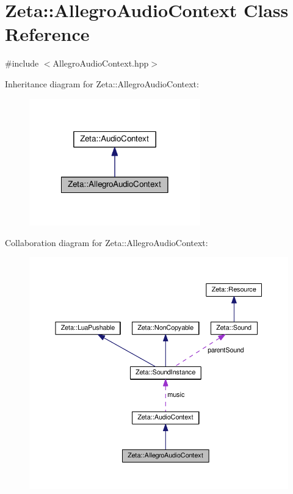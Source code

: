 \hypertarget{classZeta_1_1AllegroAudioContext}{\section{Zeta\+:\+:Allegro\+Audio\+Context Class Reference}
\label{classZeta_1_1AllegroAudioContext}
}


{\ttfamily \#include $<$Allegro\+Audio\+Context.\+hpp$>$}



Inheritance diagram for Zeta\+:\+:Allegro\+Audio\+Context\+:\nopagebreak
\begin{figure}[H]
\begin{center}
\leavevmode
\includegraphics[width=210pt]{classZeta_1_1AllegroAudioContext__inherit__graph}
\end{center}
\end{figure}


Collaboration diagram for Zeta\+:\+:Allegro\+Audio\+Context\+:\nopagebreak
\begin{figure}[H]
\begin{center}
\leavevmode
\includegraphics[width=350pt]{classZeta_1_1AllegroAudioContext__coll__graph}
\end{center}
\end{figure}
